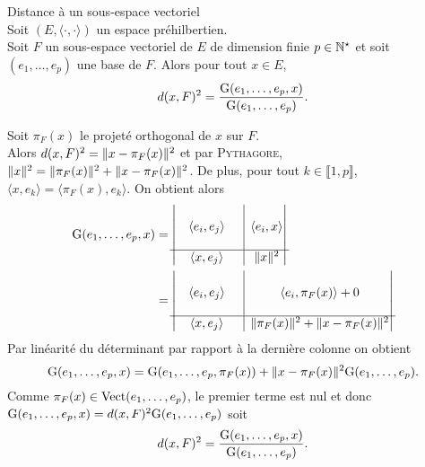 \begin{theo} \label{distance_a_un_sous_espace_vectoriel}
    Distance à un sous-espace vectoriel \\
    Soit $(E, \langle \cdot , \cdot \rangle)$ un espace préhilbertien. \\
    Soit $F$ un sous-espace vectoriel de $E$ de dimension finie $p \in \mathbb{N}^\star$ et soit $(e_1, \dots, e_p)$ une base de $F$. Alors pour tout $x \in E$,
    $$d(x, F)^2 = \frac{\mathrm{G}(e_1, \dots, e_p, x)}{\mathrm{G}(e_1, \dots, e_p)}.$$
\end{theo}

\begin{preuve}
    Soit $\pi_F(x)$ le projeté orthogonal de $x$ sur $F$. \\
    Alors $d(x, F)^2 = \Vert x - \pi_F(x) \Vert^2$ et par \textsc{Pythagore}, $\Vert x \Vert^2 = \Vert \pi_F(x) \Vert^2 + \Vert x - \pi_F(x) \Vert^2$. De plus, pour tout $k \in \llbracket 1, p \rrbracket$, $\langle x , e_k \rangle = \langle \pi_F(x) , e_k \rangle$. On obtient alors
    \begin{align*}
        \Gram(e_1, \dots, e_p, x) &= 
        \begin{vmatrix}
          \begin{matrix}
            & & \\
            & \langle e_i, e_j \rangle & \\
            & &
          \end{matrix}
          & \rvline & \langle e_i, x \rangle \\
        \hline
          \langle x, e_j \rangle & \rvline &
          \begin{matrix}
          \norme{x}^2
          \end{matrix}
        \end{vmatrix} \\
        &=
        \begin{vmatrix}
          \begin{matrix}
            & & \\
            & \langle e_i, e_j \rangle & \\
            & &
          \end{matrix}
          & \rvline & \langle e_i, \pi_F(x) \rangle + 0 \\
        \hline
          \langle x, e_j \rangle & \rvline &
          \begin{matrix}
          \norme{\pi_F(x)}^2 + \norme{x - \pi_F(x)}^2
          \end{matrix}
        \end{vmatrix} 
    \end{align*}
    Par linéarité du déterminant par rapport à la dernière colonne on obtient
    $$\mathrm{G}(e_1, \dots, e_p, x) = \mathrm{G}(e_1, \dots, e_p, \pi_F(x)) + \Vert x - \pi_F(x) \Vert^2 \mathrm{G}(e_1, \dots, e_p).$$
    Comme $\pi_F(x) \in \mathrm{Vect}(e_1, \dots, e_p)$, le premier terme est nul et donc $\mathrm{G}(e_1, \dots, e_p, x) = d(x, F)^2 \mathrm{G}(e_1, \dots, e_p)$ soit 
    $$d(x, F)^2 = \frac{\mathrm{G}(e_1, \dots, e_p, x)}{\mathrm{G}(e_1, \dots, e_p)}.$$
\end{preuve}

